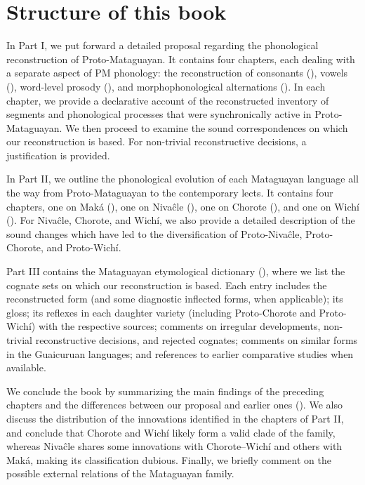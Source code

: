 \section{Structure of this book}\label{structure}

In Part I, we put forward a detailed proposal regarding the phonological reconstruction of Proto-Mataguayan. It contains four chapters, each dealing with a separate aspect of PM phonology: the reconstruction of consonants (), vowels (), word-level prosody (), and morphophonological alternations (). In each chapter, we provide a declarative account of the reconstructed inventory of segments and phonological processes that were synchronically active in Proto-Mataguayan. We then proceed to examine the sound correspondences on which our reconstruction is based. For non-trivial reconstructive decisions, a justification is provided.

In Part II, we outline the phonological evolution of each Mataguayan language all the way from Proto-Mataguayan to the contemporary lects. It contains four chapters, one on Maká (), one on Nivaĉle (), one on Chorote (), and one on Wichí (). For Nivaĉle, Chorote, and Wichí, we also provide a detailed description of the sound changes which have led to the diversification of Proto-Nivaĉle, Proto-Chorote, and Proto-Wichí.

Part III contains the Mataguayan etymological dictionary (), where we list the cognate sets on which our reconstruction is based. Each entry includes the reconstructed form (and some diagnostic inflected forms, when applicable); its gloss; its reflexes in each daughter variety (including Proto-Chorote and Proto-Wichí) with the respective sources; comments on irregular developments, non-trivial reconstructive decisions, and rejected cognates; comments on similar forms in the Guaicuruan languages; and references to earlier comparative studies when available.

We conclude the book by summarizing the main findings of the preceding chapters and the differences between our proposal and earlier ones (). We also discuss the distribution of the innovations identified in the chapters of Part II, and conclude that Chorote and Wichí likely form a valid clade of the family, whereas Nivaĉle shares some innovations with Chorote--Wichí and others with Maká, making its classification dubious. Finally, we briefly comment on the possible external relations of the Mataguayan family.
